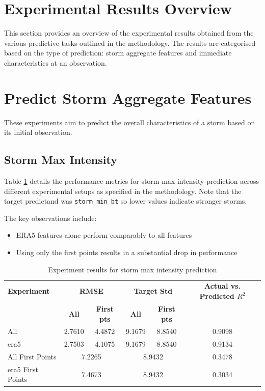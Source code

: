 \section{Experimental Results Overview}

This section provides an overview of the experimental results obtained from the various predictive tasks outlined in the methodology. The results are categorised based on the type of prediction: storm aggregate features and immediate characteristics at an observation. 

\section{Predict Storm Aggregate Features}

These experiments aim to predict the overall characteristics of a storm based on its initial observation.

\subsection{Storm Max Intensity}

Table \ref{tab:storm_max_intensity_results} details the performance metrics for storm max intensity prediction across different experimental setups as specified in the methodology. Note that the target predictand was \texttt{storm\_min\_bt} so lower values indicate stronger storms.

The key observations include: 
\begin{itemize}
    \item ERA5 features alone perform comparably to all features
    \item Using only the first points results in a substantial drop in performance
\end{itemize}

\begin{table}[ht]
\centering
\caption{Experiment results for storm max intensity prediction}
\label{tab:storm_max_intensity_results}
\begin{tabular}{lccccc}
\hline
\textbf{Experiment} & \multicolumn{2}{c}{\textbf{RMSE}} & \multicolumn{2}{c}{\textbf{Target Std}} & \textbf{Actual vs. Predicted $R^2$} \\
\cline{2-5}
 & \textbf{All} & \textbf{First pts} & \textbf{All} & \textbf{First pts} &  \\
\hline
All              & 2.7610 & 4.4872 & 9.1679 & 8.8540 & 0.9098 \\
\acrshort{era5}             & 2.7503 & 4.1075 & 9.1679 & 8.8540 & 0.9134 \\
All First Points & \multicolumn{2}{c}{7.2265} & \multicolumn{2}{c}{8.9432} & 0.3478 \\
\acrshort{era5} First Points & \multicolumn{2}{c}{7.4673} & \multicolumn{2}{c}{8.9432} & 0.3034 \\
\hline
\end{tabular}
\end{table}

